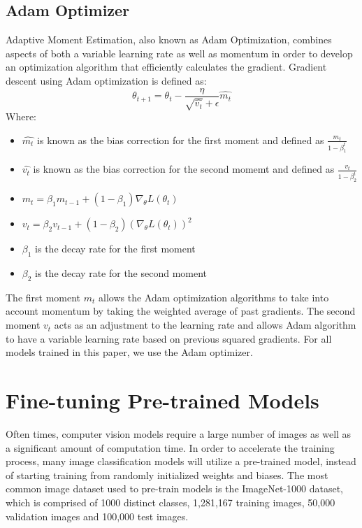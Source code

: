 \documentclass [MS] {uclathes}
\begin{document}
\subsection{Adam Optimizer}
Adaptive Moment Estimation, also known as Adam Optimization, combines aspects of both a variable learning rate as well 
as momentum in order to develop an optimization algorithm that efficiently calculates the gradient. Gradient descent 
using Adam optimization is defined as:
\[\theta_{t+1} = \theta_{t} - \frac{\eta}{\sqrt{\hat{v_t}} + \epsilon} \hat{m_{t}}\]
Where:
\begin{itemize}
    \item \(\hat{m_{t}}\) is known as the bias correction for the first moment and defined as \(\frac{m_t}{1-\beta_1^t}\)
    \item \(\hat{v_t}\) is known as the bias correction for the second momemt and defined as \(\frac{v_t}{1-\beta_2^t}\)
    \item \(m_t = \beta_1 m_{t-1} + (1 - \beta_1) \nabla_{\theta} L(\theta_t)\)
    \item \(v_t = \beta_2 v_{t-1} + (1 - \beta_2) (\nabla_{\theta} L(\theta_t))^2\)
    \item \(\beta_1\) is the decay rate for the first moment
    \item \(\beta_2\) is the decay rate for the second moment
\end{itemize}

The first moment \(m_t\) allows the Adam optimization algorithms to take into account momentum by taking the weighted 
average of past gradients. The second moment \(v_t\) acts as an adjustment to the learning rate and allows Adam 
algorithm to have a variable learning rate based on previous squared gradients. For all models trained in this paper, we 
use the Adam optimizer.

\section{Fine-tuning Pre-trained Models}
Often times, computer vision models require a large number of images as well as a significant amount of computation 
time. In order to accelerate the training process, many image classification models will utilize a pre-trained model, 
instead of starting training from randomly initialized weights and biases. The most common image dataset used to 
pre-train models is the ImageNet-1000 dataset, which is comprised of 1000 distinct classes, 1,281,167 training images, 
50,000 validation images and 100,000 test images.
\end{document}
